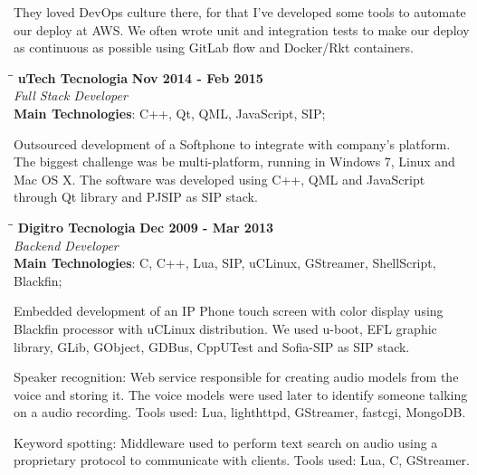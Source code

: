 \documentclass[margin]{res}
\begin{document}
\begin{resume}
They loved DevOps culture there, for that I've developed some tools to automate our deploy at AWS. We often wrote unit and integration tests to make our deploy as continuous as possible using GitLab flow and Docker/Rkt containers.

\vspace{-0.1in}
    \begin{tabbing}
    \hspace{2.3in}\= \hspace{1.7in}\= \kill
    \textbf{uTech Tecnologia}    \>\>\textbf{Nov 2014 - Feb 2015}\\
    \textit{Full Stack Developer}\\
    \textbf{Main Technologies}: C++, Qt, QML, JavaScript, SIP;
    \end{tabbing}\vspace{-20pt}
    \vspace{2mm}
Outsourced development of a Softphone to integrate with company’s platform. The biggest challenge was be multi-platform, running in Windows 7, Linux and Mac OS X. The software was developed using C++, QML and JavaScript through Qt library and PJSIP as SIP stack.

\vspace{-0.1in}
    \begin{tabbing}
    \hspace{2.3in}\= \hspace{1.7in}\= \kill
    \textbf{Digitro Tecnologia}    \>\>\textbf{Dec 2009 - Mar 2013}\\
    \textit{Backend Developer}\\
    \textbf{Main Technologies}: C, C++, Lua, SIP, uCLinux, GStreamer, ShellScript, Blackfin;
    \end{tabbing}\vspace{-20pt}
    \vspace{2mm}
Embedded development of an IP Phone touch screen with color display using Blackfin processor with uCLinux distribution. We used u-boot, EFL graphic library, GLib, GObject, GDBus, CppUTest and Sofia-SIP as SIP stack.

Speaker recognition: Web service responsible for creating audio models from the voice and storing it. The voice models were used later to identify someone talking on a audio recording. Tools used: Lua, lighthttpd, GStreamer, fastcgi, MongoDB.

Keyword spotting: Middleware used to perform text search on audio using a proprietary protocol to communicate with clients. Tools used: Lua, C, GStreamer.


\end{resume}
\end{document}
